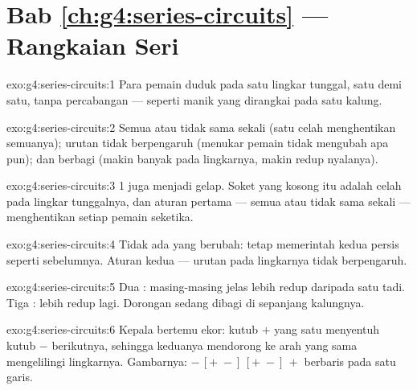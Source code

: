 \section*{Bab \ref{ch:g4:series-circuits} --- Rangkaian Seri}

\begin{solution}{exo:g4:series-circuits:1}
Para pemain duduk pada satu lingkar tunggal, satu demi satu, tanpa
percabangan --- seperti manik yang dirangkai pada satu kalung.
\end{solution}

\begin{solution}{exo:g4:series-circuits:2}
Semua atau tidak sama sekali (satu celah menghentikan semuanya);
urutan tidak berpengaruh (menukar pemain tidak mengubah apa pun); dan
berbagi (makin banyak  pada lingkarnya, makin redup nyalanya).
\end{solution}

\begin{solution}{exo:g4:series-circuits:3}
 1 juga menjadi gelap. Soket yang kosong itu adalah celah pada
lingkar tunggalnya, dan aturan pertama --- semua atau tidak sama
sekali --- menghentikan setiap pemain seketika.
\end{solution}

\begin{solution}{exo:g4:series-circuits:4}
Tidak ada yang berubah:  tetap memerintah kedua 
persis seperti sebelumnya. Aturan kedua --- urutan pada lingkarnya
tidak berpengaruh.
\end{solution}

\begin{solution}{exo:g4:series-circuits:5}
Dua : masing-masing jelas lebih redup daripada satu  tadi.
Tiga : lebih redup lagi. Dorongan  sedang dibagi di
sepanjang kalungnya.
\end{solution}

\begin{solution}{exo:g4:series-circuits:6}
Kepala bertemu ekor: kutub $+$ yang satu menyentuh kutub $-$
berikutnya, sehingga keduanya mendorong ke arah yang sama mengelilingi
lingkarnya. Gambarnya: $-\,[{+}\;{-}]\,[{+}\;
{-}]\,+$ berbaris pada satu garis.
\end{solution}

